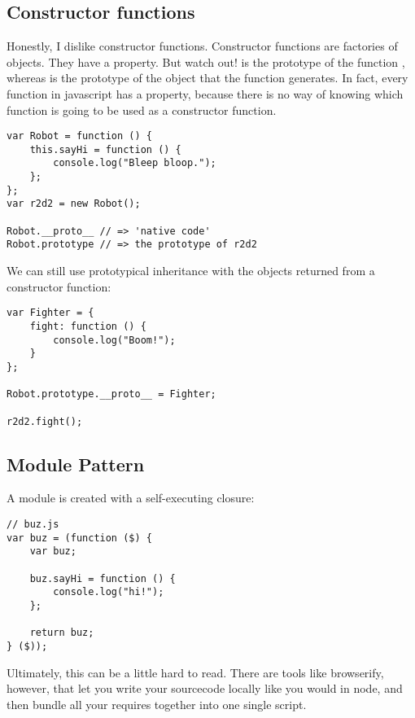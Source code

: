 \subsection{Constructor functions}

Honestly, I dislike constructor functions. 
Constructor functions are factories of objects. They have a   property. But watch out! 
 is the prototype of the function , whereas   is the prototype of the object that the function generates.
In fact, every function in javascript has a   property, because there is no way of knowing which function is going to be used as a constructor function. 

\begin{lstlisting}
var Robot = function () {
    this.sayHi = function () {
        console.log("Bleep bloop.");
    };
};
var r2d2 = new Robot();

Robot.__proto__ // => 'native code'
Robot.prototype // => the prototype of r2d2
\end{lstlisting}

We can still use prototypical inheritance with the objects returned from a constructor function:

\begin{lstlisting}
var Fighter = {
	fight: function () {
		console.log("Boom!");
	}
};

Robot.prototype.__proto__ = Fighter;

r2d2.fight();
\end{lstlisting}


\subsection{Module Pattern}
A module is created with a self-executing closure: 

\begin{lstlisting}
// buz.js
var buz = (function ($) {
    var buz;
    
    buz.sayHi = function () {
        console.log("hi!");
    };
    
    return buz;
} ($));
\end{lstlisting}

Ultimately, this can be a little hard to read. There are tools like browserify, however, that let you write your sourcecode locally like you would in node, and then bundle all your requires together into one single script. 


